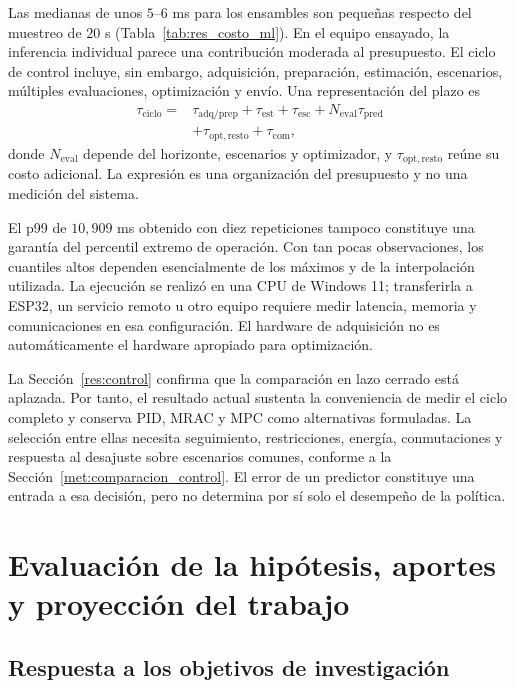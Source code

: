 Las medianas de unos $5$--$6$ ms para los ensambles son pequeñas respecto del muestreo de $20$ s (Tabla~\ref{tab:res_costo_ml}). En el equipo ensayado, la inferencia individual parece una contribución moderada al presupuesto. El ciclo de control incluye, sin embargo, adquisición, preparación, estimación, escenarios, múltiples evaluaciones, optimización y envío. Una representación del plazo es
\begin{equation}
\begin{split}
\tau_{\mathrm{ciclo}}={}&\tau_{\mathrm{adq/prep}}+\tau_{\mathrm{est}}
+\tau_{\mathrm{esc}}+N_{\mathrm{eval}}\tau_{\mathrm{pred}}\\
&+\tau_{\mathrm{opt,resto}}+\tau_{\mathrm{com}},
\end{split}
\label{eq:dis_presupuesto_control}
\end{equation}
donde $N_{\mathrm{eval}}$ depende del horizonte, escenarios y optimizador, y $\tau_{\mathrm{opt,resto}}$ reúne su costo adicional. La expresión es una organización del presupuesto y no una medición del sistema.

El p99 de $10{,}909$ ms obtenido con diez repeticiones tampoco constituye una garantía del percentil extremo de operación. Con tan pocas observaciones, los cuantiles altos dependen esencialmente de los máximos y de la interpolación utilizada. La ejecución se realizó en una CPU de Windows 11; transferirla a ESP32, un servicio remoto u otro equipo requiere medir latencia, memoria y comunicaciones en esa configuración. El hardware de adquisición no es automáticamente el hardware apropiado para optimización.

La Sección~\ref{res:control} confirma que la comparación en lazo cerrado está aplazada. Por tanto, el resultado actual sustenta la conveniencia de medir el ciclo completo y conserva PID, MRAC y MPC como alternativas formuladas. La selección entre ellas necesita seguimiento, restricciones, energía, conmutaciones y respuesta al desajuste sobre escenarios comunes, conforme a la Sección~\ref{met:comparacion_control}. El error de un predictor constituye una entrada a esa decisión, pero no determina por sí solo el desempeño de la política.
\FloatBarrier

\section{Evaluación de la hipótesis, aportes y proyección del trabajo}
\label{dis:objetivos}

\subsection{Respuesta a los objetivos de investigación}

